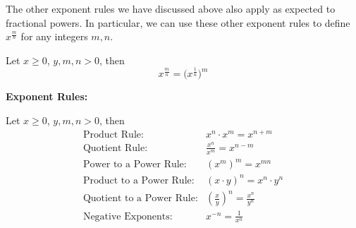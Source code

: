 \documentclass{ximera}
\begin{document}
  The other exponent rules we have discussed above also apply as expected to fractional powers. In particular, we can use these other exponent rules to define $x^{\frac{m}{n}}$ for any integers $m,n$.
  
  \begin{definition}
  Let $x\geq 0$, $y,m,n >0$, then
  $$x^{\frac{m}{n}} = \big(x^{\frac{1}{n}}\big)^m$$
 \end{definition}


 \begin{summary}

\end{summary}
\textbf{Exponent Rules:}

  Let $x\geq 0$, $y,m,n >0$, then \\

\[
\begin{array}{ll}
\text{Product Rule:}&x^{n} \cdot x^{m} = x^{n+m}\\[4ex]
\text{Quotient Rule:}&\frac{x^n}{x^m}=x^{n-m}\\[4ex]
\text{Power to a Power Rule:}&\left(x^{m}\right)^m = x^{mn}\\[4ex]
\text{Product to a Power Rule:}&\left(x \cdot y \right)^{n} = x^{n} \cdot y^{n}\\[4ex]
\text{Quotient to a Power Rule:}&\left(\frac{x}{y}\right)^n=\frac{x^n}{y^n}\\[4ex]
\text{Negative Exponents:}&x^{-n} = \frac{1}{x^{n}}
\end{array}
\]
\end{document}
